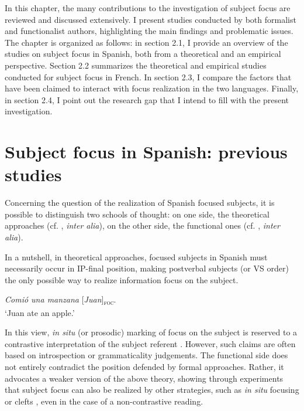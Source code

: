 In this chapter, the many contributions to the investigation of subject focus are reviewed and discussed extensively. I present studies conducted by both formalist and functionalist authors, highlighting the main findings and problematic issues. The chapter is organized as follows: in section 2.1, I provide an overview of the studies on subject focus in Spanish, both from a theoretical and an empirical perspective. Section 2.2 summarizes the theoretical and empirical studies conducted for subject focus in French. In section 2.3, I compare the factors that have been claimed to interact with focus realization in the two languages. Finally, in section 2.4, I point out the research gap that I intend to fill with the present investigation.


\section{Subject focus in Spanish: previous studies}


Concerning the question of the realization of Spanish focused subjects, it is possible to distinguish two schools of thought:  on one side, the theoretical approaches (cf. \cite{zubizarreta1998prosody, ramalle2005manual, costa2001postverbal, gutierrez2013structural, samek2001crosslinguistic}, \textit{inter alia}), on the other side, the functional ones (cf. \cite{gabriel2007fokus, gabriel2010focus, heidinger2013information, uth2014spanish, hualde2002intonation}, \textit{inter alia}).

In a nutshell, in theoretical approaches, focused subjects in Spanish must necessarily occur in IP-final position, making postverbal subjects (or VS order) the only possible way to realize information focus on the subject. 

 \ea \label{ex501} \textit{Comió una manzana} {[\textit{Juan}]\textsubscript{\textsc{foc}}}\normalsize. \\
`Juan ate an apple.'
\z


In this view, \textit{in situ} (or prosodic) marking of focus on the subject is reserved to a contrastive interpretation of the subject referent \parencite[4228]{zubizarreta1999word}. 
However, such claims are often based on introspection or grammaticality judgements. The functional side does not entirely contradict the position defended by formal approaches. Rather, it advocates a weaker version of the above theory, showing through experiments that subject focus can also be realized by other strategies, such as \textit{in situ} focusing \parencite{gabriel2007fokus, heidinger2013information, uth2014spanish} or clefts \parencite{feldhausen2015oraciones}, even in the case of a non-contrastive reading.

